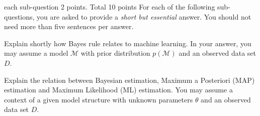 \documentclass[a4paper]{article}
\newcommand{\tjboxed}[1]{}
\begin{document}
\begin{exam}
%
%
%

\begin{vraag}{each sub-question 2 points. Total 10 points}
For each of the following sub-questions, you are asked to provide a \emph{short but essential} answer. You should not need more than five sentences per answer.

\begin{deelvraag}
    Explain shortly how Bayes rule relates to machine learning. In your answer, you may assume a model $\mathcal{M}$ with prior distribution $p(\mathcal{M})$ and an observed data set $D$.
\tjboxed{
$$ \underbrace{p(\mathcal{M}|D)}_{\text{posterior}} = \frac{p(D|\mathcal{M})}{p(D)}\underbrace{p(\mathcal{M})}_{\text{prior}}
$$
Bayes rule relates what we know about a model before (prior) and after (posterior) having seen the data. The difference between the prior and posterior distributions for the model can be interpreted as a `machine learning' effect. (Alternative answers are also possible).
}%
\end{deelvraag}

\begin{deelvraag}
    Explain the relation between Bayesian estimation, Maximum a Posteriori (MAP) estimation and Maximum Likelihood (ML) estimation. You may assume a context of a given model structure with unknown parameters $\theta$ and an observed data set $D$.
\tjboxed{
\begin{eqnarray*}
\hat \theta_{\text{bayes}} = \int_\theta \theta p(\theta|D) \d{\theta} & \text{(Bayes est.)}\\
\hat \theta_{\text{map}} = \arg\max_\theta p(\theta|D) = \arg\max_\theta p(D|\theta)p(\theta) & \text{(MAP)}\\
\hat \theta_{\text{ml}} = \arg\max_\theta p(D|\theta) & \text{(ML)}
\end{eqnarray*}
Bayes estimation picks the mean from the posterior $p(\theta|D)$. MAP picks the mode from $p(\theta|D)$. ML is MAP with uniform prior. (Alternative answers are also possible).
}%
\end{deelvraag}


\end{vraag}
\end{exam}
\end{document}
